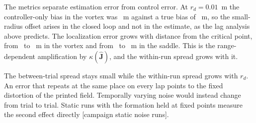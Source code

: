 \documentclass[lettersize,journal]{IEEEtran}
\newcommand{\open}[1]{\textcolor{blue!70!black}{[#1]}}
\begin{document}
The metrics separate estimation error from control error. At $r_d = 0.01$~m the controller-only bias in the vortex was \VtxOrbThreeCtrlSmall~m against a true bias of \VtxOrbThreeBiasSmall~m, so the small-radius offset arises in the closed loop and not in the estimate, as the lag analysis above predicts. The localization error grows with distance from the critical point, from \VtxOrbThreeLocSmall~to \VtxOrbThreeLocLarge~m in the vortex and from \SadOrbThreeLocSmall~to \SadOrbThreeLocLarge~m in the saddle. This is the range-dependent amplification by $\kappa(\hat{\mathbf{J}})$, and the within-run spread grows with it.

The between-trial spread stays small while the within-run spread grows with $r_d$. An error that repeats at the same place on every lap points to the fixed distortion of the printed field. Temporally varying noise would instead change from trial to trial. Static runs with the formation held at fixed points measure the second effect directly \open{campaign static noise runs}.
\end{document}
